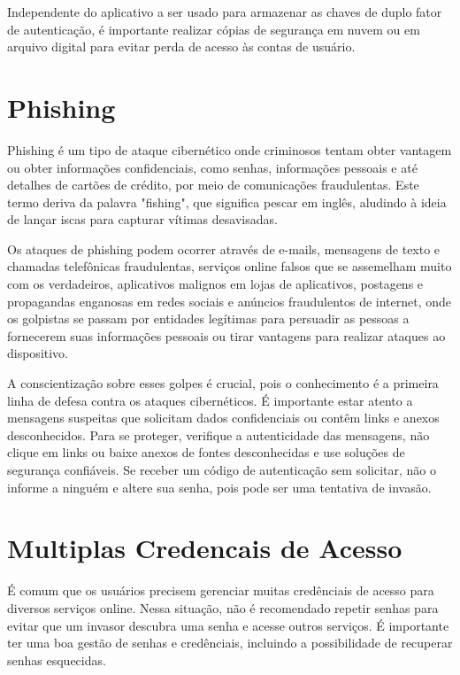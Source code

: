 \documentclass[12pt]{article}
\begin{document}
Independente do aplicativo a ser usado para armazenar as chaves de
duplo fator de autenticação, é importante realizar cópias de segurança
em nuvem ou em arquivo digital para evitar perda de acesso às contas
de usuário.

\section{Phishing}

Phishing é um tipo de ataque cibernético onde criminosos tentam obter
vantagem ou obter informações confidenciais, como senhas, informações
pessoais e até detalhes de cartões de crédito, por meio de comunicações
fraudulentas.
Este termo deriva da palavra "fishing", que significa pescar em inglês,
aludindo à ideia de lançar iscas para capturar vítimas desavisadas.

Os ataques de phishing podem ocorrer através de e-mails, mensagens de
texto e chamadas telefônicas fraudulentas, serviços online falsos que
se assemelham muito com os verdadeiros, aplicativos malignos em lojas
de aplicativos, postagens e propagandas enganosas em redes sociais e
anúncios fraudulentos de internet, onde os golpistas se passam por
entidades legítimas para persuadir as pessoas a fornecerem suas informações
pessoais ou tirar vantagens para realizar ataques ao dispositivo.

A conscientização sobre esses golpes é crucial, pois o conhecimento é a
primeira linha de defesa contra os ataques cibernéticos.
É importante estar atento a mensagens suspeitas que solicitam dados
confidenciais ou contêm links e anexos desconhecidos. Para se proteger,
verifique a autenticidade das mensagens, não clique em links ou baixe
anexos de fontes desconhecidas e use soluções de segurança confiáveis.
Se receber um código de autenticação sem solicitar, não o informe a
ninguém e altere sua senha, pois pode ser uma tentativa de invasão.

\section{Multiplas Credencais de Acesso}

É comum que os usuários precisem gerenciar muitas credênciais de acesso
para diversos serviços online.
Nessa situação, não é recomendado repetir senhas para evitar que um invasor
descubra uma senha e acesse outros serviços.
É importante ter uma boa gestão de senhas e credênciais, incluindo a
possibilidade de recuperar senhas esquecidas.
\end{document}
